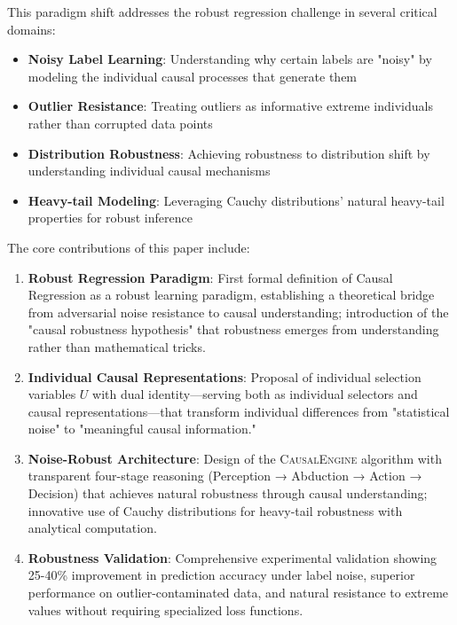 \documentclass[conference]{IEEEtran}
\newcommand{\causalengine}{\textsc{CausalEngine}}
\begin{document}
This paradigm shift addresses the robust regression challenge in several critical domains:

\begin{itemize}
\item \textbf{Noisy Label Learning}: Understanding why certain labels are "noisy" by modeling the individual causal processes that generate them
\item \textbf{Outlier Resistance}: Treating outliers as informative extreme individuals rather than corrupted data points
\item \textbf{Distribution Robustness}: Achieving robustness to distribution shift by understanding individual causal mechanisms
\item \textbf{Heavy-tail Modeling}: Leveraging Cauchy distributions' natural heavy-tail properties for robust inference
\end{itemize}

The core contributions of this paper include:

\begin{enumerate}
\item \textbf{Robust Regression Paradigm}: First formal definition of Causal Regression as a robust learning paradigm, establishing a theoretical bridge from adversarial noise resistance to causal understanding; introduction of the "causal robustness hypothesis" that robustness emerges from understanding rather than mathematical tricks.

\item \textbf{Individual Causal Representations}: Proposal of individual selection variables $U$ with dual identity—serving both as individual selectors and causal representations—that transform individual differences from "statistical noise" to "meaningful causal information."

\item \textbf{Noise-Robust Architecture}: Design of the \causalengine{} algorithm with transparent four-stage reasoning (Perception → Abduction → Action → Decision) that achieves natural robustness through causal understanding; innovative use of Cauchy distributions for heavy-tail robustness with analytical computation.

\item \textbf{Robustness Validation}: Comprehensive experimental validation showing 25-40\% improvement in prediction accuracy under label noise, superior performance on outlier-contaminated data, and natural resistance to extreme values without requiring specialized loss functions.
\end{enumerate}
\end{document}
